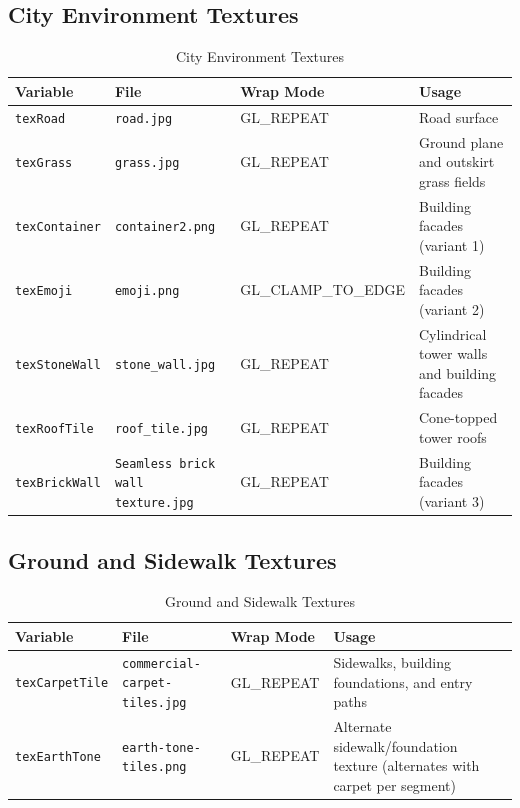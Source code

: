 \documentclass[12pt,a4paper]{article}
\begin{document}
\subsection{City Environment Textures}

\begin{table}[H]
\centering
\begin{tabular}{lllp{5.5cm}}
\toprule
\textbf{Variable} & \textbf{File} & \textbf{Wrap Mode} & \textbf{Usage} \\
\midrule
\texttt{texRoad}       & \texttt{road.jpg}       & GL\_REPEAT & Road surface \\
\texttt{texGrass}      & \texttt{grass.jpg}      & GL\_REPEAT & Ground plane and outskirt grass fields \\
\texttt{texContainer}  & \texttt{container2.png}  & GL\_REPEAT & Building facades (variant 1) \\
\texttt{texEmoji}      & \texttt{emoji.png}      & GL\_CLAMP\_TO\_EDGE & Building facades (variant 2) \\
\texttt{texStoneWall}  & \texttt{stone\_wall.jpg} & GL\_REPEAT & Cylindrical tower walls and building facades \\
\texttt{texRoofTile}   & \texttt{roof\_tile.jpg}  & GL\_REPEAT & Cone-topped tower roofs \\
\texttt{texBrickWall}  & \texttt{Seamless brick wall texture.jpg} & GL\_REPEAT & Building facades (variant 3) \\
\bottomrule
\end{tabular}
\caption{City Environment Textures}
\end{table}

\subsection{Ground and Sidewalk Textures}

\begin{table}[H]
\centering
\begin{tabular}{lllp{5.5cm}}
\toprule
\textbf{Variable} & \textbf{File} & \textbf{Wrap Mode} & \textbf{Usage} \\
\midrule
\texttt{texCarpetTile} & \texttt{commercial-carpet-tiles.jpg} & GL\_REPEAT & Sidewalks, building foundations, and entry paths \\
\texttt{texEarthTone}  & \texttt{earth-tone-tiles.png}        & GL\_REPEAT & Alternate sidewalk/foundation texture (alternates with carpet per segment) \\
\bottomrule
\end{tabular}
\caption{Ground and Sidewalk Textures}
\end{table}
\end{document}
